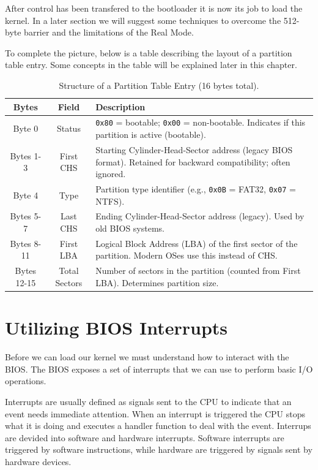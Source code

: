 After control has been transfered to the bootloader it is now its job to load the kernel. In a later section 
we will suggest some techniques to overcome the 512-byte barrier and the limitations of the Real Mode. 

To complete the picture, below is a table describing the layout of a partition table entry.
Some concepts in the table will be explained later in this chapter.

\begin{table}[h]
    \centering
    \renewcommand{\arraystretch}{1.15}
    \setlength{\tabcolsep}{10pt}
    
    \begin{tabular}{|c|c|p{7cm}|}
    \hline
    \textbf{Bytes} & \textbf{Field} & \textbf{Description} \\
    \hline
    Byte 0 & Status & 
    \texttt{0x80} = bootable; \texttt{0x00} = non-bootable. Indicates if this partition is active (bootable). \\
    \hline
    Bytes 1-3 & First CHS & 
    Starting Cylinder-Head-Sector address (legacy BIOS format). Retained for backward compatibility; often ignored. \\
    \hline
    Byte 4 & Type & 
    Partition type identifier (e.g., \texttt{0x0B} = FAT32, \texttt{0x07} = NTFS). \\
    \hline
    Bytes 5-7 & Last CHS & 
    Ending Cylinder-Head-Sector address (legacy). Used by old BIOS systems. \\
    \hline
    Bytes 8-11 & First LBA & 
    Logical Block Address (LBA) of the first sector of the partition. Modern OSes use this instead of CHS. \\
    \hline
    Bytes 12-15 & Total Sectors & 
    Number of sectors in the partition (counted from First LBA). Determines partition size. \\
    \hline
    \end{tabular}
    \caption{Structure of a Partition Table Entry (16 bytes total).}
\end{table}

\section{Utilizing BIOS Interrupts}

Before we can load our kernel we must understand how to interact with the BIOS. The BIOS exposes a set of
interrupts that we can use to perform basic I/O operations.

Interrupts are usually defined as signals sent to the CPU to indicate that an event needs immediate attention.
When an interrupt is triggered the CPU stops what it is doing and executes a handler function to deal with the event.
Interrups are devided into software and hardware interrupts. Software interrupts are triggered by software instructions, 
while hardware are triggered by signals sent by hardware devices.

